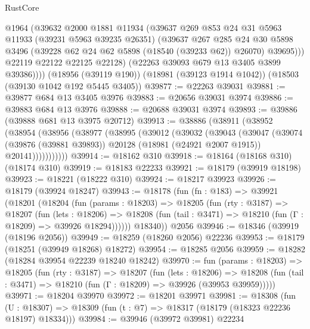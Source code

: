 \begin{lexlean}{RustCore}
\begin{coremodule}
            @1964
            (@39632
              @2000
              @1881
              @11934
              (@39637
                @269
                @853
                @24
                @31
                @5963
                @11933
                (@39231 @5963 @39235 @26351)
                (@39637
                  @267
                  @285
                  @24
                  @30
                  @5898
                  @3496
                  (@39228 @62 @24 @62 @5898 (@18540 (@39233 @62)) @26070)
                  @39695)))
            @22119
            @22122
            @22125
            @22128)
          (@22263 @39093 @679 @13 @3405 @3899 @39386))))
    (@18956 (@39119 @190))
    (@18981 (@39123 @1914 @1042))
    (@18503 (@39130 @1042 @192 @5445 @3405))
@39877 := @22263 @39031
@39881 := @39877 @684 @13 @3405 @3976
@39883 := @20656 @39031 @3974
@39886 := @39883 @684 @13 @3976
@39888 := @20688 @39031 @3974
@39893 := @39886 (@39888 @681 @13 @3975 @20712)
@39913 := @38886
    (@38911
      (@38952
        (@38954
          (@38956
            (@38977
              (@38995
                (@39012
                  (@39032
                    (@39043
                      (@39047
                        (@39074
                          (@39876 (@39881 @39893))
                          @20128
                          (@18981 (@24921 @2007 @1915))
                          @20141)))))))))))
@39914 := @18162 @310
@39918 := @18164 (@18168 @310) (@18174 @310)
@39919 := @18183 @22233
@39921 := @18179 (@39919 @18198)
@39923 := @18221 (@18222 @310)
@39924 := @18217 @39923
@39926 := @18179 (@39924 @18247)
@39943 := @18178
    (fun (fn : @183) =>
    @39921
      (@18201
        (@18204
          (fun (params : @18203) =>
          @18205
            (fun (rty : @3187) =>
            @18207
              (fun (lets : @18206) =>
              @18208 (fun (tail : @3471) => @18210 (fun (Γ : @18209) => @39926 @18294))))))
        @18340))
    @2056
@39946 := @18346 (@39919 (@18196 @2056))
@39949 := @18259 (@18260 @2056) @22236
@39953 := @18179 (@18251 (@39949 @18268) @18272)
@39954 := @18285 @2056
@39959 := @18282 (@18284 @39954 @22239 @18240 @18242)
@39970 := fun (params : @18203) =>
  @18205
    (fun (rty : @3187) =>
    @18207
      (fun (lets : @18206) =>
      @18208 (fun (tail : @3471) => @18210 (fun (Γ : @18209) => @39926 (@39953 @39959)))))
@39971 := @18204 @39970
@39972 := @18201 @39971
@39981 := @18308
    (fun (U : @18307) => @18309 (fun (t : @7) => @18317 (@18179 (@18323 @22236 @18197) @18334)))
@39984 := @39946 (@39972 @39981) @22234

\end{coremodule}
\end{lexlean}
